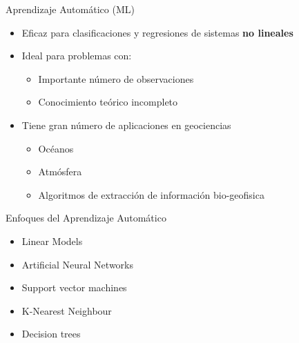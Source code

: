 \documentclass[10pt]{beamer}
\begin{document}
\begin{frame}{Aprendizaje Automático (ML)}

  \begin{itemize}
  \item Eficaz para clasificaciones y regresiones de sistemas \textbf{no
    lineales}
  \item Ideal para problemas con:
    \begin{itemize}
    \item Importante número de observaciones
    \item Conocimiento teórico incompleto
    \end{itemize}
  \item Tiene gran número de aplicaciones en geociencias
    \begin{itemize}
    \item Océanos
    \item Atmósfera
    \item Algoritmos de extracción de información bio-geofisica
    \end{itemize}
  \end{itemize}

\end{frame}

\begin{frame}{Enfoques del Aprendizaje Automático}


  \begin{itemize}
  \item Linear Models
  \item Artificial Neural Networks
  \item Support vector machines
  \item K-Nearest Neighbour
  \item Decision trees
  \end{itemize}

\end{frame}
\end{document}
